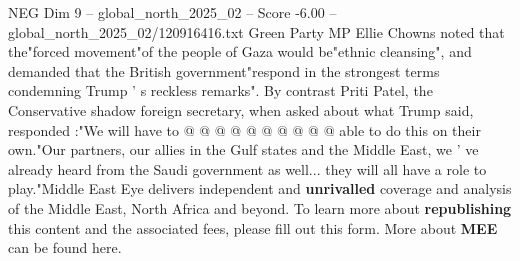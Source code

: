 \begin{textsample}{NEG Dim 9 – global\_north\_2025\_02 – Score -6.00 – global\_north\_2025\_02/120916416.txt}
Green Party MP Ellie Chowns noted that the"forced movement"of the people of Gaza would be"ethnic cleansing", and demanded that the British government"respond in the strongest terms condemning Trump ' s reckless remarks".
By contrast Priti Patel, the Conservative shadow foreign secretary, when asked about what Trump said, responded :"We will have to @ @ @ @ @ @ @ @ @ @ able to do this on their own."Our partners, our allies in the Gulf states and the Middle East, we ' ve already heard from the Saudi government as well... they will all have a role to play."Middle East Eye delivers independent and \textbf{unrivalled} coverage and analysis of the Middle East, North Africa and beyond.
To learn more about \textbf{republishing} this content and the associated fees, please fill out this form.
More about \textbf{MEE} can be found here.

\end{textsample}

